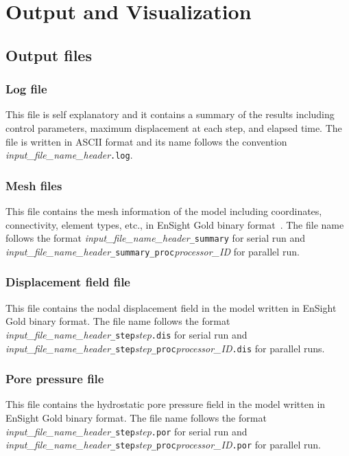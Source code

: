 \chapter{Output and Visualization}

\section{Output files}

\subsection{Log file}

This file is self explanatory and it contains a summary of the results including control parameters, maximum displacement at each step, and elapsed time. The file is written in ASCII format and its name follows the convention \emph{input\_file\_name\_header}\texttt{.log}.

\subsection{Mesh files}

This file contains the mesh information of the model including coordinates, connectivity, element types, etc., in EnSight Gold binary format~\citep[see][]{ensight2008}. The file name follows the format \emph{input\_file\_name\_header}\texttt{\_summary} for serial run and \emph{input\_file\_name\_header}\texttt{\_summary\_proc}\emph{processor\_ID} for parallel run.

\subsection{Displacement field file}

This file contains the nodal displacement field in the model written in EnSight Gold binary format. The file name follows the format \emph{input\_file\_name\_header}\texttt{\_step}\emph{step}\texttt{.dis} for serial run and \emph{input\_file\_name\_header}\texttt{\_step}\emph{step}\texttt{\_proc}\emph{processor\_ID}\texttt{.dis} for parallel runs.

\subsection{Pore pressure file}

This file contains the hydrostatic pore pressure field in the model written in EnSight Gold binary format. The file name follows the format \emph{input\_file\_name\_header}\texttt{\_step}\emph{step}\texttt{.por} for serial run and \emph{input\_file\_name\_header}\texttt{\_step}\emph{step}\texttt{\_proc}\emph{processor\_ID}\texttt{.por} for parallel run.

